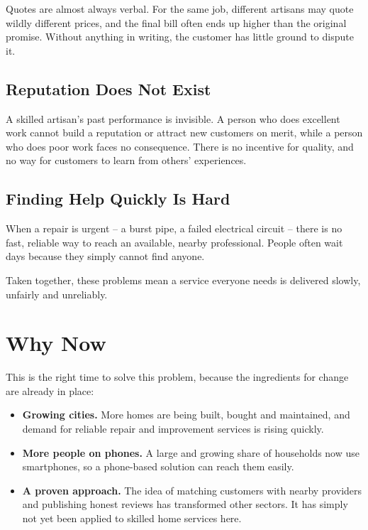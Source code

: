 \documentclass[11pt,a4paper]{article}
\begin{document}
Quotes are almost always verbal. For the same job, different artisans may quote wildly
different prices, and the final bill often ends up higher than the original promise. Without
anything in writing, the customer has little ground to dispute it.

\subsection{Reputation Does Not Exist}

A skilled artisan's past performance is invisible. A person who does excellent work cannot
build a reputation or attract new customers on merit, while a person who does poor work faces
no consequence. There is no incentive for quality, and no way for customers to learn from
others' experiences.

\subsection{Finding Help Quickly Is Hard}

When a repair is urgent -- a burst pipe, a failed electrical circuit -- there is no fast,
reliable way to reach an available, nearby professional. People often wait days because they
simply cannot find anyone.

Taken together, these problems mean a service everyone needs is delivered slowly, unfairly and
unreliably.

\section{Why Now}

This is the right time to solve this problem, because the ingredients for change are already
in place:

\begin{itemize}[leftmargin=1.5em, label={--}]
    \item \textbf{Growing cities.} More homes are being built, bought and maintained, and
          demand for reliable repair and improvement services is rising quickly.
    \item \textbf{More people on phones.} A large and growing share of households now use
          smartphones, so a phone-based solution can reach them easily.
    \item \textbf{A proven approach.} The idea of matching customers with nearby providers and
          publishing honest reviews has transformed other sectors. It has simply not yet been
          applied to skilled home services here.
\end{itemize}
\end{document}
